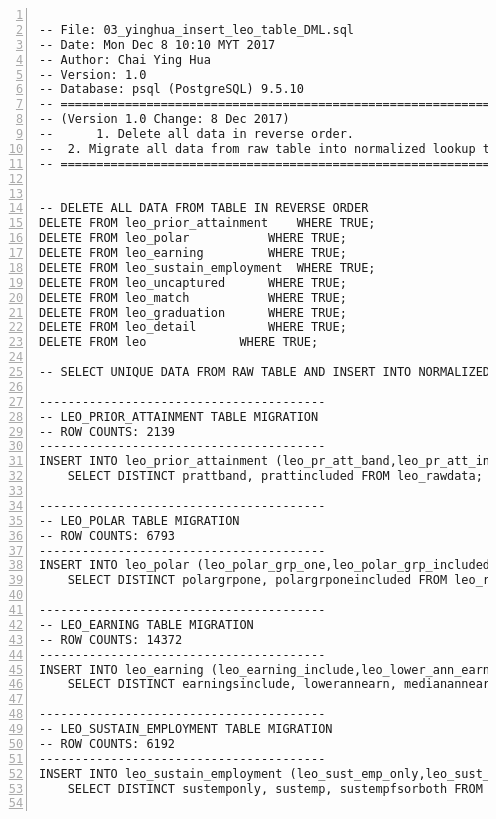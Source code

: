 \lstset{basicstyle=\ttfamily\tiny}  
\begin{lstlisting}[breaklines, frame=single, numbers=left, caption={PL/pgSQL's DML Script for Education Normalized Database Migration.}, label=commandline-02]

-- File: 03_yinghua_insert_leo_table_DML.sql
-- Date: Mon Dec 8 10:10 MYT 2017
-- Author: Chai Ying Hua 
-- Version: 1.0 
-- Database: psql (PostgreSQL) 9.5.10
-- ====================================================================
-- (Version 1.0 Change: 8 Dec 2017) 
--  	1. Delete all data in reverse order.
--	2. Migrate all data from raw table into normalized lookup table. 
-- ====================================================================


-- DELETE ALL DATA FROM TABLE IN REVERSE ORDER 
DELETE FROM leo_prior_attainment 	WHERE TRUE;
DELETE FROM leo_polar 			WHERE TRUE;
DELETE FROM leo_earning 		WHERE TRUE;
DELETE FROM leo_sustain_employment 	WHERE TRUE;
DELETE FROM leo_uncaptured 		WHERE TRUE;
DELETE FROM leo_match 			WHERE TRUE;
DELETE FROM leo_graduation 		WHERE TRUE;
DELETE FROM leo_detail 			WHERE TRUE;
DELETE FROM leo				WHERE TRUE;

-- SELECT UNIQUE DATA FROM RAW TABLE AND INSERT INTO NORMALIZED DATA. 

----------------------------------------
-- LEO_PRIOR_ATTAINMENT TABLE MIGRATION 
-- ROW COUNTS: 2139 
----------------------------------------
INSERT INTO leo_prior_attainment (leo_pr_att_band,leo_pr_att_included)
	SELECT DISTINCT prattband, prattincluded FROM leo_rawdata;

----------------------------------------
-- LEO_POLAR TABLE MIGRATION 
-- ROW COUNTS: 6793 
---------------------------------------- 
INSERT INTO leo_polar (leo_polar_grp_one,leo_polar_grp_included)
	SELECT DISTINCT polargrpone, polargrponeincluded FROM leo_rawdata;

----------------------------------------
-- LEO_EARNING TABLE MIGRATION 
-- ROW COUNTS: 14372
---------------------------------------- 
INSERT INTO leo_earning (leo_earning_include,leo_lower_ann_earn,leo_median_ann_earn,leo_upper_ann_earn)
	SELECT DISTINCT earningsinclude, lowerannearn, medianannearn, upperannearn FROM leo_rawdata;

----------------------------------------
-- LEO_SUSTAIN_EMPLOYMENT TABLE MIGRATION 
-- ROW COUNTS: 6192
---------------------------------------- 
INSERT INTO leo_sustain_employment (leo_sust_emp_only,leo_sust_emp,leo_sust_emp_fs_or_both)
	SELECT DISTINCT sustemponly, sustemp, sustempfsorboth FROM leo_rawdata;


\end{lstlisting}
